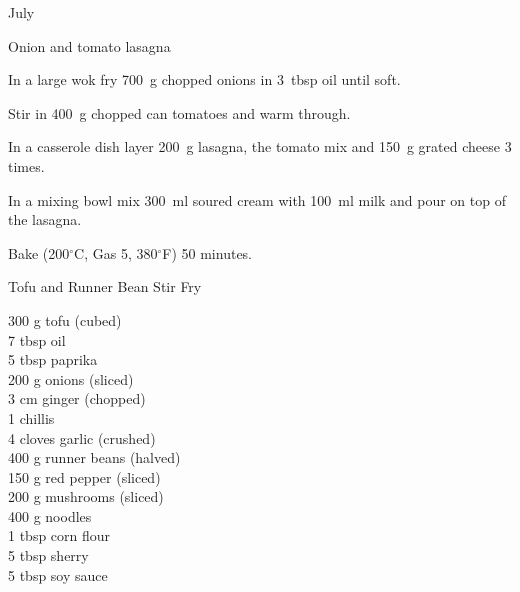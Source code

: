 \begin{menu}{July}
\begin{recipe}{2}{Onion and tomato lasagna}
\begin{ingredients}
		\end{ingredients}
	
	
    \begin{instructions}
    \item 
        In a large wok fry
        700~g chopped onions
        in
        3~tbsp  oil
        until soft.
      \item 
        Stir in 400~g chopped can tomatoes
        and warm through.
      \item 
        In a casserole dish layer
        200~g  lasagna,
        the tomato mix and
        150~g grated cheese
        3 times.
      \item 
        In a mixing bowl mix
        300~ml  soured cream
        with
        100~ml  milk
        and pour on top of the lasagna.
      \item 
        Bake 
      (200$^{\circ}$C, Gas 5, 380$^{\circ}$F)
     50 minutes.
      
    \end{instructions}
    \end{recipe}%
  
    \begin{recipe}{2}{Tofu and Runner Bean Stir Fry}%
    
		\begin{ingredients}
		300 g tofu (cubed) \\
	7 tbsp oil  \\
	5 tbsp paprika  \\
	200 g onions (sliced) \\
	3 cm ginger (chopped) \\
	1  chillis  \\
	4 cloves garlic (crushed) \\
	400 g runner beans (halved) \\
	150 g red pepper (sliced) \\
	200 g mushrooms (sliced) \\
	400 g noodles  \\
	1 tbsp corn flour  \\
	5 tbsp sherry  \\
	5 tbsp soy sauce  \\
	
		\end{ingredients}
	
	

\end{recipe}
\end{menu}
